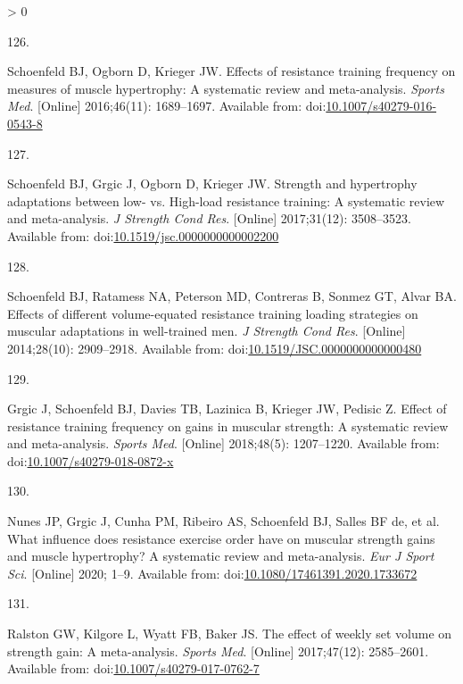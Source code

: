 \documentclass[twoside,10pt]{gihclass} %
\newlength{\cslhangindent}
\newlength{\csllabelwidth}
\newenvironment{CSLReferences}[3] %
 {%
  \setlength{\parindent}{0pt}
  \ifodd #1 \everypar{\setlength{\hangindent}{\cslhangindent}}\ignorespaces\fi
  \ifnum #2 > 0
  \setlength{\parskip}{#2\baselineskip}
  \fi
 }%
 {}
\newcommand{\CSLLeftMargin}[1]{\parbox[t]{\maxof{\widthof{#1}}{\csllabelwidth}}{#1}}
\newcommand{\CSLRightInline}[1]{\parbox[t]{\linewidth}{#1}}
\begin{document}
\begin{CSLReferences}{0}{0}
\leavevmode\hypertarget{ref-RN2571}{}%
\CSLLeftMargin{126. }
\CSLRightInline{Schoenfeld BJ, Ogborn D, Krieger JW. Effects of resistance training frequency on measures of muscle hypertrophy: A systematic review and meta-analysis. \emph{Sports Med}. {[}Online{]} 2016;46(11): 1689--1697. Available from: doi:\href{https://doi.org/10.1007/s40279-016-0543-8}{10.1007/s40279-016-0543-8}}

\leavevmode\hypertarget{ref-RN2569}{}%
\CSLLeftMargin{127. }
\CSLRightInline{Schoenfeld BJ, Grgic J, Ogborn D, Krieger JW. Strength and hypertrophy adaptations between low- vs. High-load resistance training: A systematic review and meta-analysis. \emph{J Strength Cond Res}. {[}Online{]} 2017;31(12): 3508--3523. Available from: doi:\href{https://doi.org/10.1519/jsc.0000000000002200}{10.1519/jsc.0000000000002200}}

\leavevmode\hypertarget{ref-RN1612}{}%
\CSLLeftMargin{128. }
\CSLRightInline{Schoenfeld BJ, Ratamess NA, Peterson MD, Contreras B, Sonmez GT, Alvar BA. Effects of different volume-equated resistance training loading strategies on muscular adaptations in well-trained men. \emph{J Strength Cond Res}. {[}Online{]} 2014;28(10): 2909--2918. Available from: doi:\href{https://doi.org/10.1519/JSC.0000000000000480}{10.1519/JSC.0000000000000480}}

\leavevmode\hypertarget{ref-RN2570}{}%
\CSLLeftMargin{129. }
\CSLRightInline{Grgic J, Schoenfeld BJ, Davies TB, Lazinica B, Krieger JW, Pedisic Z. Effect of resistance training frequency on gains in muscular strength: A systematic review and meta-analysis. \emph{Sports Med}. {[}Online{]} 2018;48(5): 1207--1220. Available from: doi:\href{https://doi.org/10.1007/s40279-018-0872-x}{10.1007/s40279-018-0872-x}}

\leavevmode\hypertarget{ref-RN2591}{}%
\CSLLeftMargin{130. }
\CSLRightInline{Nunes JP, Grgic J, Cunha PM, Ribeiro AS, Schoenfeld BJ, Salles BF de, et al. What influence does resistance exercise order have on muscular strength gains and muscle hypertrophy? A systematic review and meta-analysis. \emph{Eur J Sport Sci}. {[}Online{]} 2020; 1--9. Available from: doi:\href{https://doi.org/10.1080/17461391.2020.1733672}{10.1080/17461391.2020.1733672}}

\leavevmode\hypertarget{ref-RN2492}{}%
\CSLLeftMargin{131. }
\CSLRightInline{Ralston GW, Kilgore L, Wyatt FB, Baker JS. The effect of weekly set volume on strength gain: A meta-analysis. \emph{Sports Med}. {[}Online{]} 2017;47(12): 2585--2601. Available from: doi:\href{https://doi.org/10.1007/s40279-017-0762-7}{10.1007/s40279-017-0762-7}}


\end{CSLReferences}
\end{document}
